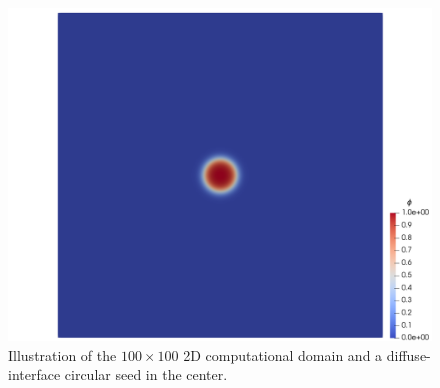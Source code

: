\documentclass[preprint,12pt]{elsarticle}
\begin{document}
%
\begin{center}
\begin{figure} 
\begin{centering}
\includegraphics[scale=0.65]{t0_single_seed.PNG}
\par\end{centering}
\caption{Illustration of the $100 \times 100$ 2D computational domain and a diffuse-interface circular seed in the center. } \label{fig:t0_single_seed}
\end{figure}
\par\end{center}
%
\end{document}
